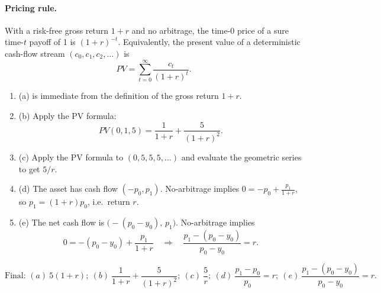 \documentclass[12pt]{article}
\begin{document}
\paragraph{Pricing rule.}
With a risk-free gross return \(1+r\) and no arbitrage, the time-0 price of a sure time-\(t\) payoff of 1 is \((1+r)^{-t}\).
Equivalently, the present value of a deterministic cash-flow stream \((c_0,c_1,c_2,\dots)\) is
\[
PV=\sum_{t=0}^\infty \frac{c_t}{(1+r)^t}.
\]

\begin{enumerate}[label=(\alph*), leftmargin=*]
\item (a) is immediate from the definition of the gross return \(1+r\).

\item (b) Apply the PV formula:
\[
PV(0,1,5)=\frac{1}{1+r}+\frac{5}{(1+r)^2}.
\]

\item (c) Apply the PV formula to \((0,5,5,5,\dots)\) and evaluate the geometric series to get \(5/r\).

\item (d) The asset has cash flow \((-p_0, p_1)\). No-arbitrage implies \(0 = -p_0 + \frac{p_1}{1+r}\), so \(p_1=(1+r)p_0\), i.e.\ return \(r\).

\item (e) The net cash flow is \(\bigl(-(p_0-y_0),\,p_1\bigr)\). No-arbitrage implies
\[
0=-(p_0-y_0)+\frac{p_1}{1+r}
\quad\Rightarrow\quad
\frac{p_1-(p_0-y_0)}{p_0-y_0}=r.
\]
\end{enumerate}

\[
\boxed{\text{Final: }(a)\ 5(1+r);\ (b)\ \frac{1}{1+r}+\frac{5}{(1+r)^2};\ (c)\ \frac{5}{r};\ (d)\ \frac{p_1-p_0}{p_0}=r;\ (e)\ \frac{p_1-(p_0-y_0)}{p_0-y_0}=r.}
\]
\end{document}
